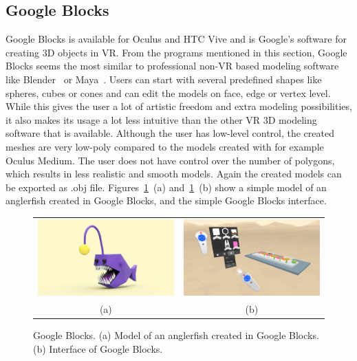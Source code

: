 \subsection{Google Blocks}
Google Blocks is available for Oculus and HTC Vive and is Google's software for creating 3D objects in VR. From the programs mentioned in this section, Google Blocks seems the most similar to professional non-VR based modeling software like Blender~\cite{Blender} or Maya~\cite{Maya}. Users can start with several predefined shapes like spheres, cubes or cones and can edit the models on face, edge or vertex level. While this gives the user a lot of artistic freedom and extra modeling possibilities, it also makes its usage a lot less intuitive than the other VR 3D modeling software that is available. Although the user has low-level control, the created meshes are very low-poly compared to the models created with for example Oculus Medium. The user does not have control over the number of polygons, which results in less realistic and smooth models. Again the created models can be exported as .obj file. Figures~\ref{fig:blocks}~(a) and~\ref{fig:blocks}~(b) show a simple model of an anglerfish created in Google Blocks, and the simple Google Blocks interface.

\begin{figure}[!h]
    \centering
    \setlength{\tabcolsep}{0.0130\linewidth}
    \begin{tabular}{@{}cc@{}}
   	\includegraphics[width=0.487\linewidth]{figures/blocks_anglerfish}&
   	\includegraphics[width=0.487\linewidth]{figures/blocks_interface}\\
    (a)&(b)\\
    \end{tabular}
    \caption[Google Blocks]{Google Blocks.
    	  \textup{(a)} Model of an anglerfish created in Google Blocks.
			  \textup{(b)} Interface of Google Blocks. 
      \label{fig:blocks}}
\end{figure}